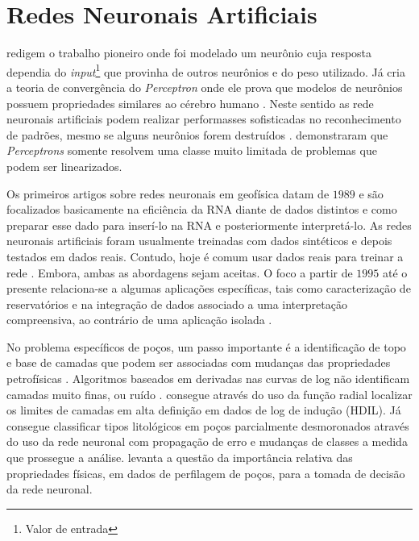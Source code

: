 
\section{Redes Neuronais Artificiais}

\citet{McCulloch1943} redigem o trabalho pioneiro onde foi modelado um neurônio cuja resposta dependia do \textit{input}\footnote{Valor de entrada} que provinha de outros neurônios e do peso utilizado.  Já \citet{Rosenblatt1962} cria a teoria de convergência do \textit{Perceptron} onde ele prova que modelos de neurônios possuem propriedades similares ao cérebro humano \citep{Kanal2001}. Neste sentido as rede neuronais artificiais podem realizar performasses sofisticadas no reconhecimento de padrões, mesmo se alguns neurônios forem destruídos \citep{Levy1997}. \citet{Minsky1969} demonstraram que \textit{Perceptrons} somente resolvem uma classe muito limitada de problemas que podem ser linearizados.

Os primeiros artigos sobre redes neuronais em geofísica datam de $1989$ e são focalizados basicamente na eficiência da RNA diante de dados distintos e como preparar esse dado para inserí-lo na RNA e posteriormente interpretá-lo. As redes neuronais artificiais foram usualmente treinadas com dados sintéticos e depois testados em dados reais. Contudo, hoje é comum usar dados reais para treinar a rede \citep{Adibifard2014}. Embora, ambas as abordagens sejam aceitas. O foco a partir de $1995$ até o presente relaciona-se a algumas aplicações específicas, tais como caracterização de reservatórios e na integração de dados associado a uma interpretação compreensiva, ao contrário de uma aplicação isolada \citep{Poulton2002}. 

No problema específicos de poços, um passo importante é a identificação de topo e base de camadas que podem ser associadas com mudanças das propriedades petrofísicas \citep{Saljooghi2014}. Algoritmos baseados em derivadas nas curvas de log não identificam camadas muito finas, ou ruído \citep{Zhang1999}. \citet{Chakravarthy1999} consegue através do uso da função radial localizar os limites de camadas em alta definição em dados de log de indução (HDIL). Já \citet{Benaouda1999} consegue classificar tipos litológicos em poços parcialmente desmoronados através do uso da rede neuronal com propagação de erro e mudanças de classes a medida que prossegue a análise. \citet{Gloaguen2017} levanta a questão da importância relativa das propriedades físicas, em dados de perfilagem de poços,  para a tomada de decisão da rede neuronal.

